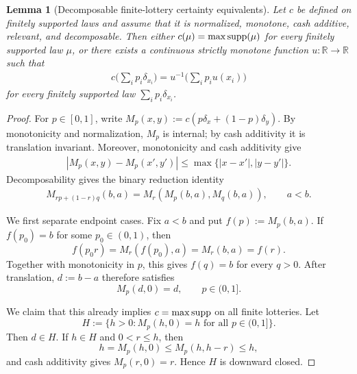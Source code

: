 \documentclass[a4paper]{amsart}
\newtheorem{lemma}[lemma]{Lemma}
\theoremstyle{definition}
\newcommand{\R}{\mathbb{R}}
\newcommand{\supp}{\textup{supp}}
\begin{document}
\begin{lemma}[Decomposable finite-lottery certainty equivalents]
\label{lem:KS-finite-lottery-reduction}
Let \(c\) be defined on finitely supported laws and assume that it is
normalized, monotone, cash additive, relevant, and decomposable. Then either
\(c(\mu)=\max\supp(\mu)\) for every finitely supported law \(\mu\), or there
exists a continuous strictly monotone function \(u:\R\to\R\) such that
\begin{align}
c\Big(\sum_i p_i\delta_{x_i}\Big)
=
u^{-1}\Big(\sum_i p_i u(x_i)\Big)
\label{eq:KS-quasi-arithmetic}
\end{align}
for every finitely supported law \(\sum_i p_i\delta_{x_i}\).
\end{lemma}

\begin{proof}
For \(p\in[0,1]\), write
\(M_p(x,y):=c(p\delta_x+(1-p)\delta_y)\). By monotonicity and normalization,
\(M_p\) is internal; by cash additivity it is translation invariant. Moreover,
monotonicity and cash additivity give
\begin{align}
|M_p(x,y)-M_p(x',y')|
\le
\max\{|x-x'|,|y-y'|\}.
\label{eq:KS-binary-lipschitz}
\end{align}
Decomposability gives the binary reduction identity
\begin{align}
M_{rp+(1-r)q}(b,a)
=
M_r(M_p(b,a),M_q(b,a)),
\qquad a<b.
\label{eq:KS-binary-reduction}
\end{align}


We first separate endpoint cases. Fix \(a<b\) and put \(f(p):=M_p(b,a)\).
If \(f(p_0)=b\) for some \(p_0\in(0,1)\), then
\[
f(p_0r)=M_r(f(p_0),a)=M_r(b,a)=f(r).
\]
Together with monotonicity in \(p\), this gives \(f(q)=b\) for every
\(q>0\). After translation, \(d:=b-a\) therefore satisfies
\[
M_p(d,0)=d,\qquad p\in(0,1].
\]

We claim that this already implies \(c=\max\supp\) on all finite lotteries.
Let
\[
H:=\{h>0: M_p(h,0)=h\text{ for all }p\in(0,1]\}.
\]
Then \(d\in H\). If \(h\in H\) and \(0<r\le h\), then
\[
h=M_p(h,0)\le M_p(h,h-r)\le h,
\]
and cash additivity gives \(M_p(r,0)=r\). Hence \(H\) is downward closed.


\end{proof}
\end{document}
